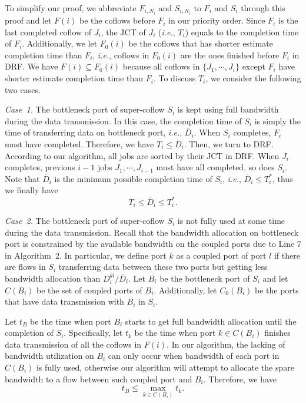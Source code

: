 \documentclass[10pt,journal,compsoc]{IEEEtran}
\begin{document}
\begin{IEEEproof}
To simplify our proof, we abbreviate $F_{i,N_i}$ and $S_{i,N_i}$ to $F_i$ and $S_i$ through this proof and let $F(i)$ be the coflows before $F_i$ in our priority order.
%
Since $F_i$ is the last completed coflow of $J_i$, the JCT of $J_i$ (\emph{i.e.}, $T_i$) equals to the completion time of $F_i$.
%
Additionally, we let $F_0(i)$ be the coflows that has shorter estimate completion time than $F_i$, \emph{i.e.}, coflows in $F_0(i)$ are the ones finished before $F_i$ in DRF.
%
We have $F(i) \subseteq F_0(i)$ because all coflows in $\{J_1,\cdots,J_i\}$ except $F_i$ have shorter estimate completion time than $F_i$.
%
To discuss $T_i$, we consider the following two cases.

\emph{Case~1.} The bottleneck port of super-coflow $S_i$ is kept using full bandwidth during the data transmission.
%
In this case, the completion time of $S_i$ is simply the time of transferring data on bottleneck port, \emph{i.e.}, $\overline{D}_i$.
%
When $S_i$ completes, $F_i$ must have completed.
%
Therefore, we have $T_i \leq \overline{D}_i$.
%
Then, we turn to DRF. According to our algorithm, all jobs are sorted by their JCT in DRF.
%
When $J_i$ completes, previous $i-1$ jobs $J_1,\cdots,J_{i-1}$ must have all completed, so does $S_i$.
%
Note that $\overline{D}_i$ is the minimum possible completion time of $S_i$, \emph{i.e.}, $\overline{D}_i \leq T_i^*$, thus we finally have
%
\begin{equation}\label{case1}
	T_i \leq \overline{D}_i \leq T_i^*.
\end{equation}

\emph{Case~2.} The bottleneck port of super-coflow $S_i$ is not fully used at some time during the data transmission.
%
Recall that the bandwidth allocation on bottleneck port is constrained by the available bandwidth on the coupled ports due to Line 7 in Algorithm~2.
%
In particular, we define port $k$ as a coupled port of port $l$ if there are flows in $S_i$ transferring data between these two ports but getting less bandwidth allocation than $D_i^{kl}/\overline{D}_i$.
%
Let $B_i$ be the bottleneck port of $S_i$ and let $C(B_i)$ be the set of coupled ports of $B_i$.
%
Additionally, let $C_0(B_i)$ be the ports that have data transmission with $B_i$ in $S_i$.

Let $t_B$ be the time when port $B_i$ starts to get full bandwidth allocation until the completion of $S_i$.
%
Specifically, let $t_k$ be the time when port $k$$\in$$C(B_i)$ finishes data transmission of all the coflows in $F(i)$.
%
In our algorithm, the lacking of bandwidth utilization on $B_i$ can only occur when bandwidth of each port in $C(B_i)$ is fully used, otherwise our algorithm will attempt to allocate the spare bandwidth to a flow between such coupled port and $B_i$. Therefore, we have
%
\begin{equation}
	t_B \leq \max_{k \in C(B_i)} t_k.
\end{equation}


\end{IEEEproof}
\end{document}

